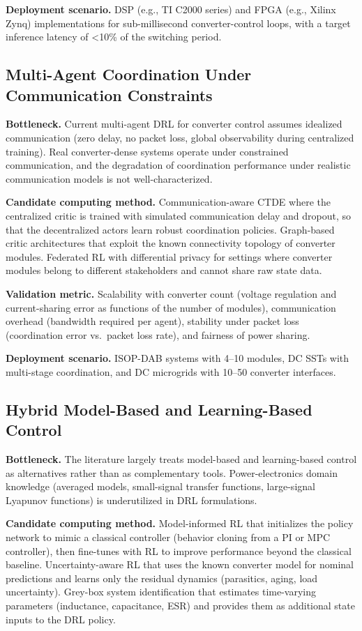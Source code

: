 \documentclass[manuscript,screen,review]{acmart}
\begin{document}
\textbf{Deployment scenario.}
DSP (e.g., TI C2000 series) and FPGA (e.g., Xilinx Zynq) implementations for sub-millisecond converter-control loops, with a target inference latency of <10\% of the switching period.

\subsection{Multi-Agent Coordination Under Communication Constraints}

\textbf{Bottleneck.}
Current multi-agent DRL for converter control assumes idealized communication (zero delay, no packet loss, global observability during centralized training).
Real converter-dense systems operate under constrained communication, and the degradation of coordination performance under realistic communication models is not well-characterized.

\textbf{Candidate computing method.}
Communication-aware CTDE where the centralized critic is trained with simulated communication delay and dropout, so that the decentralized actors learn robust coordination policies.
Graph-based critic architectures that exploit the known connectivity topology of converter modules.
Federated RL with differential privacy for settings where converter modules belong to different stakeholders and cannot share raw state data.

\textbf{Validation metric.}
Scalability with converter count (voltage regulation and current-sharing error as functions of the number of modules), communication overhead (bandwidth required per agent), stability under packet loss (coordination error vs.\ packet loss rate), and fairness of power sharing.

\textbf{Deployment scenario.}
ISOP-DAB systems with 4--10 modules, DC SSTs with multi-stage coordination, and DC microgrids with 10--50 converter interfaces.

\subsection{Hybrid Model-Based and Learning-Based Control}

\textbf{Bottleneck.}
The literature largely treats model-based and learning-based control as alternatives rather than as complementary tools.
Power-electronics domain knowledge (averaged models, small-signal transfer functions, large-signal Lyapunov functions) is underutilized in DRL formulations.

\textbf{Candidate computing method.}
Model-informed RL that initializes the policy network to mimic a classical controller (behavior cloning from a PI or MPC controller), then fine-tunes with RL to improve performance beyond the classical baseline.
Uncertainty-aware RL that uses the known converter model for nominal predictions and learns only the residual dynamics (parasitics, aging, load uncertainty).
Grey-box system identification that estimates time-varying parameters (inductance, capacitance, ESR) and provides them as additional state inputs to the DRL policy.
\end{document}
